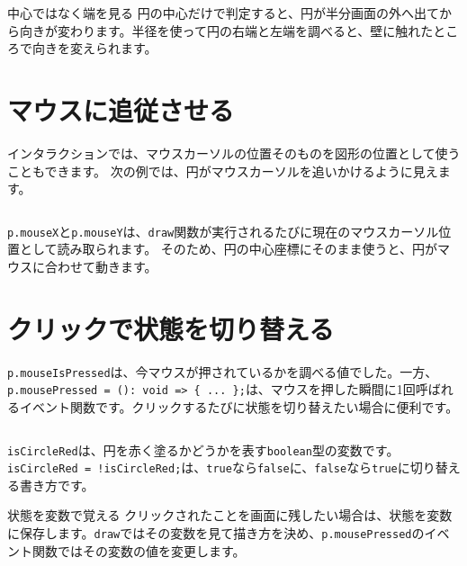 \begin{notebox}{中心ではなく端を見る}
円の中心だけで判定すると、円が半分画面の外へ出てから向きが変わります。半径を使って円の右端と左端を調べると、壁に触れたところで向きを変えられます。
\end{notebox}

\section{マウスに追従させる}

インタラクションでは、マウスカーソルの位置そのものを図形の位置として使うこともできます。
次の例では、円がマウスカーソルを追いかけるように見えます。

\begin{listing}[htbp]
\inputminted{ts}{typescript-p5/listings/chapter06/mouse-follow.ts}
\caption{マウスの位置に円を描く（\texttt{chapter06/mouse-follow.ts}）}
\label{lst:chapter06-mouse-follow}
\end{listing}

\texttt{p.mouseX}と\texttt{p.mouseY}は、\texttt{draw}関数が実行されるたびに現在のマウスカーソル位置として読み取られます。
そのため、円の中心座標にそのまま使うと、円がマウスに合わせて動きます。

\section{クリックで状態を切り替える}

\texttt{p.mouseIsPressed}は、今マウスが押されているかを調べる値でした。一方、\texttt{p.mousePressed = (): void => \{ ... \};}は、マウスを押した瞬間に1回呼ばれるイベント関数です。クリックするたびに状態を切り替えたい場合に便利です。

\begin{listing}[htbp]
\inputminted{ts}{typescript-p5/listings/chapter06/mouse-click-toggle.ts}
\caption{クリックするたびに円の色を切り替える（\texttt{chapter06/mouse-click-toggle.ts}）}
\label{lst:chapter06-mouse-click-toggle}
\end{listing}

\texttt{isCircleRed}は、円を赤く塗るかどうかを表す\texttt{boolean}型の変数です。\texttt{isCircleRed = !isCircleRed;}は、\texttt{true}なら\texttt{false}に、\texttt{false}なら\texttt{true}に切り替える書き方です。

\begin{pointbox}{状態を変数で覚える}
クリックされたことを画面に残したい場合は、状態を変数に保存します。\texttt{draw}ではその変数を見て描き方を決め、\texttt{p.mousePressed}のイベント関数ではその変数の値を変更します。
\end{pointbox}

